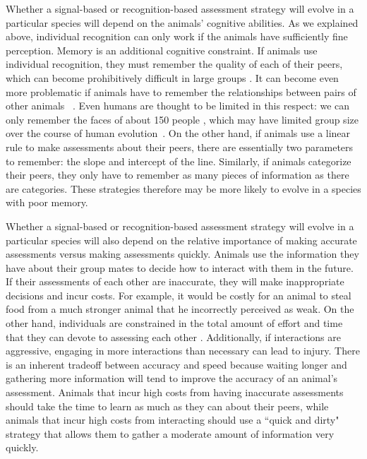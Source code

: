 Whether a signal-based or recognition-based assessment strategy will evolve in a particular species will depend on the animals' cognitive abilities. As we explained above, individual recognition can only work if the animals have sufficiently fine perception. Memory is an additional cognitive constraint. If animals use individual recognition, they must remember the quality of each of their peers, which can become prohibitively difficult in large groups  \citep{Rohwer:1982fk,Solberg:1997uq}. It can become even more problematic if animals have to remember the relationships between pairs of other animals ~\citep{Seyfarth2015SocialCognition}. Even humans are thought to be limited in this respect: we can only remember the faces of about 150 people \citep{Dunbar:1993zr,Hill:2003ly}, which may have limited group size over the course of human evolution~\citep{Dunbar:1992ys,Dunbar:1993zr}. On the other hand, if animals use a linear rule to make assessments about their peers, there are essentially two parameters to remember: the slope and intercept of the line. Similarly, if animals categorize their peers, they only have to remember as many pieces of information as there are categories. These strategies therefore may be more likely to evolve in a species with poor memory.

Whether a signal-based or recognition-based assessment strategy will evolve in a particular species will also depend on the relative importance of making accurate assessments versus making assessments quickly. Animals use the information they have about their group mates to decide how to interact with them in the future. If their assessments of each other are inaccurate, they will make inappropriate decisions and incur costs. For example, it would be costly for an animal to steal food from a much stronger animal that he incorrectly perceived as weak. On the other hand, individuals are constrained in the total amount of effort and time that they can devote to assessing each other \citep{MacIver:2010ve}. Additionally, if interactions are aggressive, engaging in more interactions than necessary can lead to injury. There is an inherent tradeoff between accuracy and speed because waiting longer and gathering more information will tend to improve the accuracy of an animal's assessment. Animals that incur high costs from having inaccurate assessments should take the time to learn as much as they can about their peers, while animals that incur high costs from interacting should use a ``quick and dirty" strategy that allows them to gather a moderate amount of information very quickly. 

